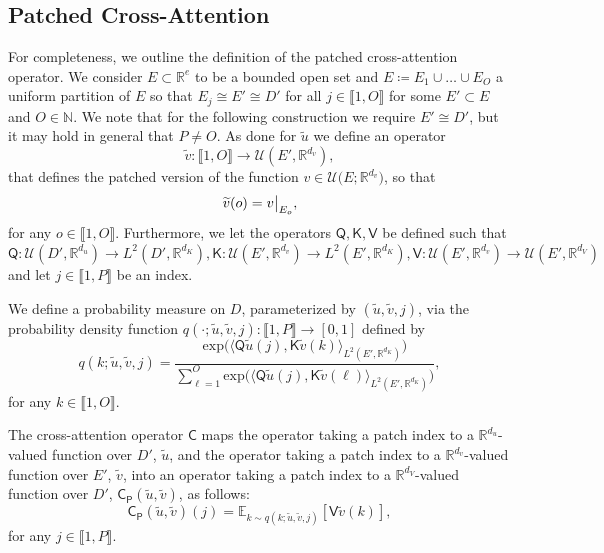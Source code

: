 \documentclass[twoside]{article}
\newcommand{\1}{\mathbbm{1}}
\newcommand{\R}{\mathbbm{R}}
\newcommand{\N}{\mathbbm{N}}
\newcommand{\cU}{\mathcal{U}}
\newcommand{\sC}{\mathsf{C}}
\newcommand{\sCp}{\mathsf{C}_{\mathsf{P}}}
\newcommand{\sQ}{\mathsf{Q}}
\newcommand{\sK}{\mathsf{K}}
\newcommand{\sV}{\mathsf{V}}
\newcommand{\range}[2]{\llbracket #1, #2 \rrbracket}
\providecommand{\mathbbm}{\mathbb} %
\newcommand{\E}{\mathbb{E}}
\newcommand\restr[2]{{%
  \left.\kern-\nulldelimiterspace %
  #1 %
  \littletaller %
  \right|_{#2} %
  }}
\newcommand{\littletaller}{\mathchoice{\vphantom{\big|}}{}{}{}}
\begin{document}
\subsection{Patched Cross-Attention}
\label{subsec:patch-cross-attention}

For completeness, we outline the definition of the patched cross-attention operator. We consider $E\subset \R^e$ to be a bounded open set and $E\coloneqq E_1\cup\ldots \cup E_O$ a uniform partition of $E$ so that $E_j\cong E' \cong D'$ for all $j\in\range{1}{O}$ for some $E'\subset E$ and $O\in \N$. We note that for the following construction we require $E'\cong D'$, but it may hold in general that $P\neq O$. As done for $\widetilde{u}$ we define an operator 
\begin{equation}
\widetilde{v}:\range{1}{O} \to \cU(E' ,\mathbb{R}^{d_v}),
\end{equation}
that defines the patched version of the function $v\in \cU\bigl( E; \R^{d_v} \bigr)$, so that
\begin{equation}
\widetilde{v}(o) = \restr{v}{E_o},
\end{equation}
for any $o\in\range{1}{O}$. Furthermore, we let the operators $\sQ,\sK,\sV$ be defined such that $\sQ:\cU(D' ,\mathbb{R}^{d_u})\to L^2(D' ,\mathbb{R}^{d_K}), \sK:\cU(E' ,\mathbb{R}^{d_v})\to L^2(E' ,\mathbb{R}^{d_K}), \sV: \cU(E' ,\mathbb{R}^{d_v})\to \cU(E' ,\mathbb{R}^{d_V}) $ and let $j \in \range{1}{P}$ be an index.

\begin{definition}
\label{d:9}
We define a probability measure on $D$, parameterized by $(\tilde{u},\tilde{v},j)$, via the probability density function $q(\cdot;\widetilde{u},\widetilde{v},j): \range{1}{P} \to [0,1]$ defined by
\[q(k; \widetilde{u},\widetilde{v}, j) = \frac{\mathrm{exp} \Big ( \big\langle \sQ \widetilde{u}(j), \sK \widetilde{v}(k) \big\rangle_{L^2(E' ,\mathbb{R}^{d_K})} \Big )}{\sum_{\ell=1}^O \mathrm{exp} \Big ( \big\langle \sQ \widetilde{u}(j), \sK \widetilde{v}(\ell) \big\rangle_{L^2(E' ,\mathbb{R}^{d_K})} \Big )},\]
for any $k \in \range{1}{{O}}$.
\end{definition}

\begin{definition}
\label{d:10}
The cross-attention operator $\sC$ maps the operator taking a patch index to a $\R^{d_u}$-valued function over $D'$, $\widetilde{u}$, 
and the operator taking a patch index to a $\R^{d_v}$-valued function over $E'$, $\widetilde{v}$, into an operator taking a patch index to a $\R^{d_V}$-valued function over $D'$, $\sCp(\widetilde{u},\widetilde{v})$, as follows:
\[\sCp(\widetilde{u},\widetilde{v})(j) = \E_{k \sim q(k;\widetilde{u},\widetilde{v},j)} [\sV \widetilde{v}(k)],\]
for any $j\in\range{1}{P}$.
\end{definition}
\end{document}
